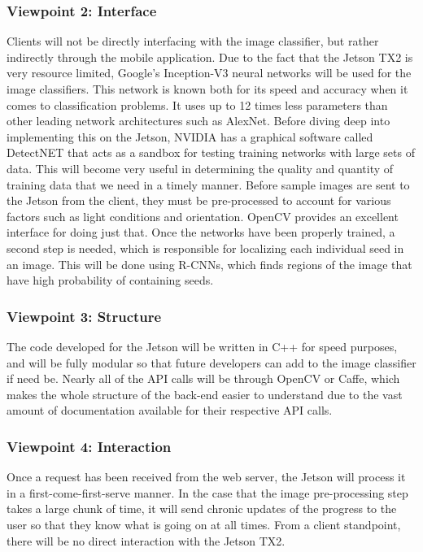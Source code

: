\documentclass[onecolumn, draftclsnofoot,10pt, compsoc]{IEEEtran}
\begin{document}
        \subsubsection{Viewpoint 2: Interface}
        	Clients will not be directly interfacing with the image classifier, but rather indirectly through the mobile application. Due to the fact that the Jetson TX2 is very resource limited, Google's Inception-V3 neural networks will be used for the image classifiers. This network is known both for its speed and accuracy when it comes to classification problems. It uses up to 12 times less parameters than other leading network architectures such as AlexNet. Before diving deep into implementing this on the Jetson, NVIDIA has a graphical software called DetectNET that acts as a sandbox for testing training networks with large sets of data. This will become very useful in determining the quality and quantity of training data that we need in a timely manner. Before sample images are sent to the Jetson from the client, they must be pre-processed to account for various factors such as light conditions and orientation. OpenCV provides an excellent interface for doing just that. Once the networks have been properly trained, a second step is needed, which is responsible for localizing each individual seed in an image. This will be done using R-CNNs, which finds regions of the image that have high probability of containing seeds.
            
        \subsubsection{Viewpoint 3: Structure}
        	The code developed for the Jetson will be written in C++ for speed purposes, and will be fully modular so that future developers can add to the image classifier if need be. Nearly all of the API calls will be through OpenCV or Caffe, which makes the whole structure of the back-end easier to understand due to the vast amount of documentation available for their respective API calls. 
        	
        \subsubsection{Viewpoint 4: Interaction}
        	Once a request has been received from the web server, the Jetson will process it in a first-come-first-serve manner. In the case that the image pre-processing step takes a large chunk of time, it will send chronic updates of the progress to the user so that they know what is going on at all times. From a client standpoint, there will be no direct interaction with the Jetson TX2. 
                
\end{document}

